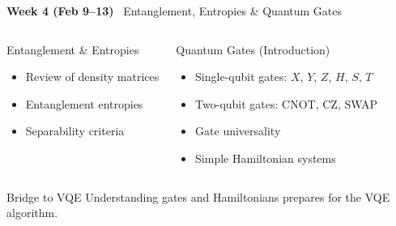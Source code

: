 \documentclass[aspectratio=169,10pt]{beamer}
\newcommand{\week}[1]{\textcolor{blue!60!black}{\textbf{#1}}}
\begin{document}
\begin{frame}{\week{Week 4 (Feb 9--13)} \ Entanglement, Entropies \& Quantum Gates}
  \begin{columns}[T]
      \begin{block}{Entanglement \& Entropies}
        \begin{itemize}
          \item Review of density matrices
          \item Entanglement entropies
          \item Separability criteria
        \end{itemize}
      \end{block}
      \begin{block}{Quantum Gates (Introduction)}
        \begin{itemize}
          \item Single-qubit gates: $X$, $Y$, $Z$, $H$, $S$, $T$
          \item Two-qubit gates: CNOT, CZ, SWAP
          \item Gate universality
          \item Simple Hamiltonian systems
        \end{itemize}
      \end{block}
  \end{columns}
  \vspace{6pt}
  \begin{alertblock}{Bridge to VQE}
    Understanding gates and Hamiltonians prepares for the VQE algorithm.
  \end{alertblock}
\end{frame}
\end{document}

